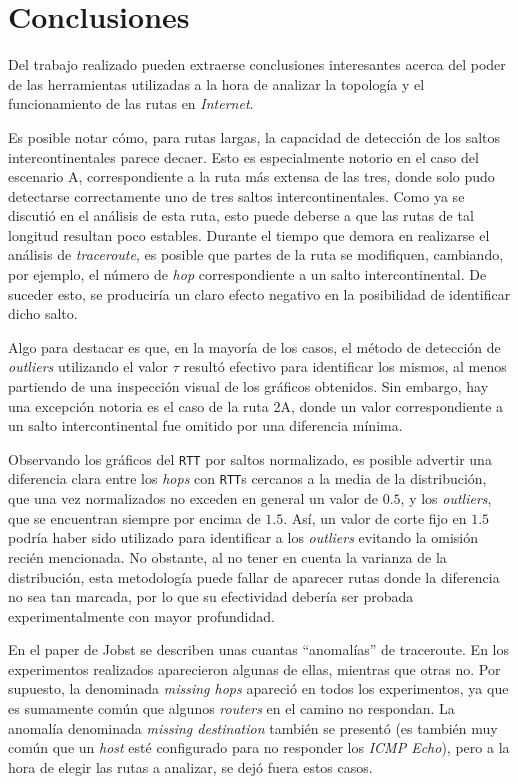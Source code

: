 \section{Conclusiones}

Del trabajo realizado pueden extraerse conclusiones interesantes acerca del
poder de las herramientas utilizadas a la hora de analizar la topología y el
funcionamiento de las rutas en \emph{Internet}.

Es posible notar cómo, para rutas largas, la capacidad de detección de los
saltos intercontinentales parece decaer. Esto es especialmente notorio en el
caso del escenario A, correspondiente a la ruta más extensa de las tres, donde
solo pudo detectarse correctamente uno de tres saltos intercontinentales. Como
ya se discutió en el análisis de esta ruta, esto puede deberse a que las
rutas de tal longitud resultan poco estables. Durante el tiempo que demora
en realizarse el análisis de \emph{traceroute}, es posible que partes de la
ruta se modifiquen, cambiando, por ejemplo, el número de \emph{hop}
correspondiente a un salto intercontinental. De suceder esto, se produciría
un claro efecto negativo en la posibilidad de identificar dicho salto.

Algo para destacar es que, en la mayoría de los casos, el método de detección
de \emph{outliers} utilizando el valor $\tau$ resultó efectivo para
identificar los mismos, al menos partiendo de una inspección visual de los
gráficos obtenidos. Sin embargo, hay una excepción notoria es el caso de la
ruta 2A, donde un valor correspondiente a un salto intercontinental fue
omitido por una diferencia mínima.

Observando los gráficos del \texttt{RTT} por saltos normalizado, es posible
advertir una diferencia clara entre los \emph{hops} con \texttt{RTT}s cercanos
a la media de la distribución, que una vez normalizados no exceden en general
un valor de $0.5$, y los \emph{outliers}, que se encuentran siempre por encima
de $1.5$. Así, un valor de corte fijo en $1.5$ podría haber sido utilizado
para identificar a los \emph{outliers} evitando la omisión recién mencionada.
No obstante, al no tener en cuenta la varianza de la distribución, esta
metodología puede fallar de aparecer rutas donde la diferencia no sea tan
marcada, por lo que su efectividad debería ser probada experimentalmente con
mayor profundidad.

En el paper de Jobst\cite{Jobst} se describen unas cuantas ``anomalías'' de traceroute. En los experimentos realizados aparecieron algunas de ellas, mientras que otras no. Por supuesto, la denominada \emph{missing hops} apareció en todos los experimentos, ya que es sumamente común que algunos \emph{routers} en el camino no respondan. La anomalía denominada \emph{missing destination} también se presentó (es también muy común que un \emph{host} esté configurado para no responder los \emph{ICMP Echo}), pero a la hora de elegir las rutas a analizar, se dejó fuera estos casos. 


